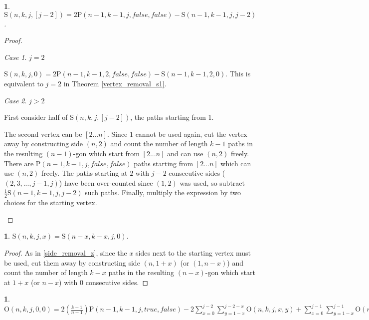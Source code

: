 \documentclass[a4paper, 12pt] {article}
\theoremstyle{remark}
\theoremstyle{plain}
\newcommand{\thistheoremname}{}
\newtheorem{genericthm}[theorem]{\thistheoremname}
\newenvironment{namedthm}[1]
  {\renewcommand{\thistheoremname}{#1}
   \begin{genericthm}}
  {\end{genericthm}}
\theoremstyle{remark}
\newtheorem{case}{Case}
\begin{document}
\begin{namedthm}{Vertex Removal Theorem S2}
\label{vertex_removal_s2}
$\mathrm{S}(n,k,j,[j-2])=2\mathrm{P}(n-1,k-1,j,false,false)-\mathrm{S}(n-1,k-1,j,j-2)$.
\end{namedthm}

\begin{proof}

\begin{case} $j=2$

$\mathrm{S}(n,k,j,0)=2\mathrm{P}(n-1,k-1,2,false,false)-\mathrm{S}(n-1,k-1,2,0)$. This is equivalent to $j=2$ in Theorem \ref{vertex_removal_s1}.
\end{case}

\begin{case} $j>2$

First consider half of $\mathrm{S}(n,k,j,[j-2])$, the paths starting from 1.

The second vertex can be $[2...n]$. Since $1$ cannot be used again, cut the vertex away by constructing side $(n,2)$ and count the number of length $k-1$ paths in the resulting $(n-1)$-gon which start from $[2...n]$ and can use $(n,2)$ freely. There are $\mathrm{P}(n-1,k-1,j,false,false)$ paths starting from $[2...n]$ which can use $(n,2)$ freely. The paths starting at $2$ with $j-2$ consecutive sides ($(2,3,...,j-1,j)$) have been over-counted since $(1,2)$ was used, so subtract $\frac{1}{2}\mathrm{S}(n-1,k-1,j,j-2)$ such paths. Finally, multiply the expression by two choices for the starting vertex.
\end{case}

\end{proof}


\begin{namedthm}{Side Removal Theorem S}
\label{side_removal_s}
$\mathrm{S}(n,k,j,x)=\mathrm{S}(n-x,k-x,j,0)$.
\end{namedthm}

\begin{proof}
As in \ref{side_removal_z}, since the $x$ sides next to the starting vertex must be used, cut them away by constructing side $(n,1+x)$ (or $(1,n-x)$) and count the number of length $k-x$ paths in the resulting $(n-x)$-gon which start at $1+x$ (or $n-x$) with $0$ consecutive sides.
\end{proof}


\begin{namedthm}{Vertex Merge Theorem O}
\label{vertex_merge_o}
$\mathrm{O}(n,k,j,0,0)=2\left(\frac{k-1}{n-1}\right)\mathrm{P}(n-1,k-1,j,true,false)-2\sum_{x=0}^{j-2} \sum_{y=1-x}^{j-2-x} \mathrm{O}(n,k,j,x,y)+\sum_{x=0}^{j-1} \sum_{y=1-x}^{j-1} \mathrm{O}(n,k,j,x,y)$
\end{namedthm}
\end{document}
